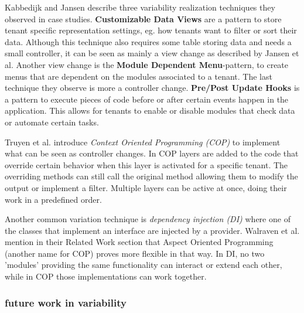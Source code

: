 Kabbedijk and Jansen \cite{kabbedijk2011variability} describe three variability realization techniques they observed in case studies. 
\textbf{Customizable Data Views} are a pattern to store tenant specific representation settings, eg. how tenants want to filter or sort their data. 
Although this technique also requires some table storing data and needs a small controller, it can be seen as mainly a view change as described by Jansen et al. 
Another view change is the \textbf{Module Dependent Menu}-pattern, to create menus that are dependent on the modules associated to a tenant. The last technique they observe is more a controller change. 
\textbf{Pre/Post Update Hooks} is a pattern to execute pieces of code before or after certain events happen in the application. 
This allows for tenants to enable or disable modules that check data or automate certain tasks.

Truyen et al. \cite{truyen2012context} introduce \textit{Context Oriented Programming (COP)} to implement what can be seen as controller changes. 
In COP layers are added to the code that override certain behavior when this layer is activated for a specific tenant. 
The overriding methods can still call the original method allowing them to modify the output or implement a filter. 
Multiple layers can be active at once, doing their work in a predefined order.

Another common variation technique is \textit{dependency injection (DI)} \cite{walraven2011middleware} where one of the classes that implement an interface are injected by a provider. 
Walraven et al. mention in their Related Work section that Aspect Oriented Programming (another name for COP) proves more flexible in that way. 
In DI, no two 'modules' providing the same functionality can interact or extend each other, while in COP those implementations can work together.

\subsubsection{future work in variability}
